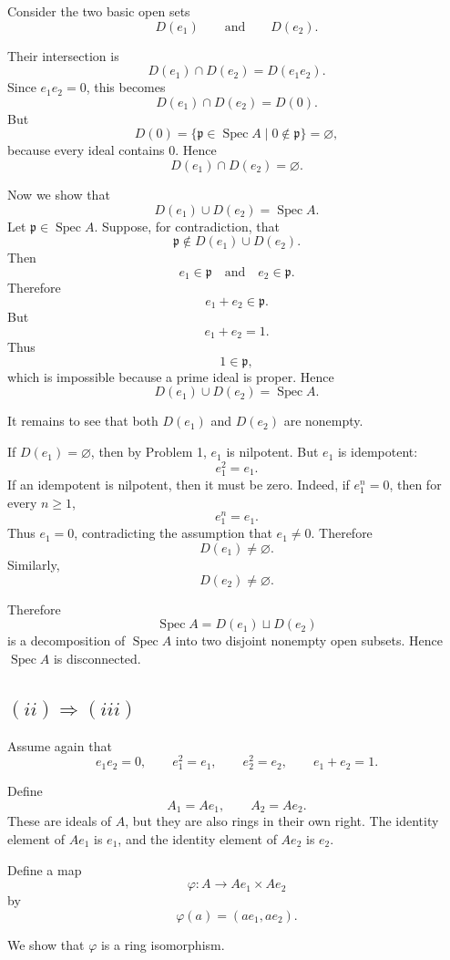 	Consider the two basic open sets
	\[
	D(e_1)
	\qquad\text{and}\qquad
	D(e_2).
	\]
	
	Their intersection is
	\[
	D(e_1)\cap D(e_2)=D(e_1e_2).
	\]
	Since \(e_1e_2=0\), this becomes
	\[
	D(e_1)\cap D(e_2)=D(0).
	\]
	But
	\[
	D(0)=\{\mathfrak p\in\operatorname{Spec} A\mid 0\notin \mathfrak p\}=\varnothing,
	\]
	because every ideal contains \(0\). Hence
	\[
	D(e_1)\cap D(e_2)=\varnothing.
	\]
	
	Now we show that
	\[
	D(e_1)\cup D(e_2)=\operatorname{Spec} A.
	\]
	Let \(\mathfrak p\in\operatorname{Spec} A\). Suppose, for contradiction, that
	\[
	\mathfrak p\notin D(e_1)\cup D(e_2).
	\]
	Then
	\[
	e_1\in\mathfrak p
	\quad\text{and}\quad
	e_2\in\mathfrak p.
	\]
	Therefore
	\[
	e_1+e_2\in \mathfrak p.
	\]
	But
	\[
	e_1+e_2=1.
	\]
	Thus
	\[
	1\in\mathfrak p,
	\]
	which is impossible because a prime ideal is proper. Hence
	\[
	D(e_1)\cup D(e_2)=\operatorname{Spec} A.
	\]
	
	It remains to see that both \(D(e_1)\) and \(D(e_2)\) are nonempty.
	
	If \(D(e_1)=\varnothing\), then by Problem 1, \(e_1\) is nilpotent. But \(e_1\)
	is idempotent:
	\[
	e_1^2=e_1.
	\]
	If an idempotent is nilpotent, then it must be zero. Indeed, if \(e_1^n=0\), then
	for every \(n\geq 1\),
	\[
	e_1^n=e_1.
	\]
	Thus \(e_1=0\), contradicting the assumption that \(e_1\neq 0\). Therefore
	\[
	D(e_1)\neq \varnothing.
	\]
	Similarly,
	\[
	D(e_2)\neq \varnothing.
	\]
	
	Therefore
	\[
	\operatorname{Spec} A=D(e_1)\sqcup D(e_2)
	\]
	is a decomposition of \(\operatorname{Spec} A\) into two disjoint nonempty open subsets. Hence
	\(\operatorname{Spec} A\) is disconnected.
	
	\subsection*{\((ii)\Rightarrow(iii)\)}
	
	Assume again that
	\[
	e_1e_2=0,
	\qquad
	e_1^2=e_1,
	\qquad
	e_2^2=e_2,
	\qquad
	e_1+e_2=1.
	\]
	
	Define
	\[
	A_1=Ae_1,
	\qquad
	A_2=Ae_2.
	\]
	These are ideals of \(A\), but they are also rings in their own right. The
	identity element of \(Ae_1\) is \(e_1\), and the identity element of \(Ae_2\) is
	\(e_2\).
	
	Define a map
	\[
	\varphi:A\longrightarrow Ae_1\times Ae_2
	\]
	by
	\[
	\varphi(a)=(ae_1,ae_2).
	\]
	
	We show that \(\varphi\) is a ring isomorphism.
	
